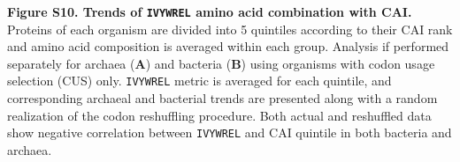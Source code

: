 \documentclass{report}
\begin{document}


{\bf Figure S10. Trends of \texttt{IVYWREL} amino acid combination with CAI.} Proteins of each organism are divided into 5 quintiles according to their CAI rank and amino acid composition is averaged within each group. Analysis if performed separately for archaea ({\bf A}) and bacteria ({\bf B}) using organisms with codon usage selection (CUS) only. \texttt{IVYWREL} metric is averaged for each quintile, and corresponding archaeal and bacterial trends are presented along with a random realization of the codon reshuffling procedure. Both actual and reshuffled data show negative correlation between \texttt{IVYWREL} and CAI quintile in both bacteria and archaea.

\end{document}
